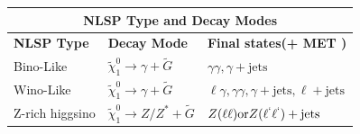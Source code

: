 \documentclass[12pt]{beamer}
\begin{document}
\begin{frame}
\begin{table}
\begin{minipage}[b]{1.0\linewidth}\centering
  \begin{tabular}{|l||l||l|}
  \hline
  \multicolumn{3}{|c|}{\bfseries{NLSP Type and Decay Modes}} \\
  \hline 
  \bfseries{NLSP Type} & \bfseries{Decay Mode} & \bfseries{Final states(+ MET )} \\
   \hline
  Bino-Like & $\tilde{\chi}^{0}_{1}\rightarrow \gamma + \tilde{G}$ & $\gamma\gamma,\gamma +\mbox{jets}$ \\ 
  \hline
  Wino-Like & $\tilde{\chi}^{0}_{1}\rightarrow \gamma + \tilde{G}$ & $\ell\gamma,\gamma\gamma,\gamma +\mbox{jets},\ell + \mbox{jets}$\\
  \hline
  Z-rich higgsino & $\tilde{\chi}^{0}_{1}\rightarrow Z/Z^{*} + \tilde{G}$ & $Z(\ell\ell) \mbox{or} Z(\ell^{`}\ell^{`}) + \mbox{jets}$\\
  \hline
  
  \end{tabular}
  \end{minipage}
\end{table}

\end{frame}
\end{document}
